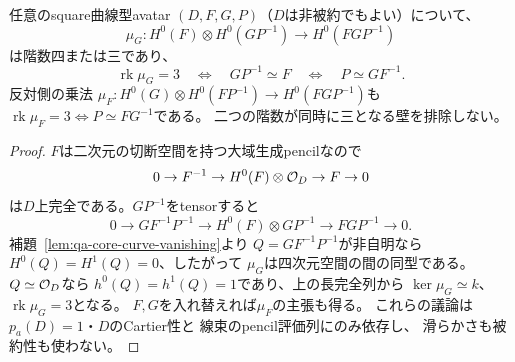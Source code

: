 \begin{lemma}[十本矢壁のpencilによる必要十分条件]
\label{lem:qa-as10-rank-wall-pencils}
任意のsquare曲線型avatar
$(D,F,G,P)$（$D$は非被約でもよい）について、
\[
 \mu_G:H^0(F)\otimes H^0(GP^{-1})
   \longrightarrow H^0(FGP^{-1})
\]
は階数四または三であり、
\begin{equation}
 \operatorname{rk}\mu_G=3
 \quad\Longleftrightarrow\quad
 GP^{-1}\simeq F
 \quad\Longleftrightarrow\quad P\simeq GF^{-1}.
 \label{eq:qa-as10-rank-wall}
\end{equation}
反対側の乗法
$\mu_F:H^0(G)\otimes H^0(FP^{-1})
 \to H^0(FGP^{-1})$も
$\operatorname{rk}\mu_F=3\Leftrightarrow P\simeq FG^{-1}$である。
二つの階数が同時に三となる壁を排除しない。
\end{lemma}
\begin{proof}
$F$は二次元の切断空間を持つ大域生成pencilなので
\[
0\to F^{-1}\to H^0(F)\otimes\mathcal O_D\to F\to0
\]
は$D$上完全である。$GP^{-1}$をtensorすると
\[
0\to GF^{-1}P^{-1}
 \to H^0(F)\otimes GP^{-1}
 \to FGP^{-1}\to0.
\]
補題~\ref{lem:qa-core-curve-vanishing}より
$Q=GF^{-1}P^{-1}$が非自明なら
$H^0(Q)=H^1(Q)=0$、したがって
$\mu_G$は四次元空間の間の同型である。
$Q\simeq\mathcal O_D$なら
$h^0(Q)=h^1(Q)=1$であり、上の長完全列から
$\ker\mu_G\simeq k$、$\operatorname{rk}\mu_G=3$となる。
$F,G$を入れ替えれば$\mu_F$の主張も得る。
これらの議論は$p_a(D)=1$・$D$のCartier性と
線束のpencil評価列にのみ依存し、
滑らかさも被約性も使わない。
\end{proof}



